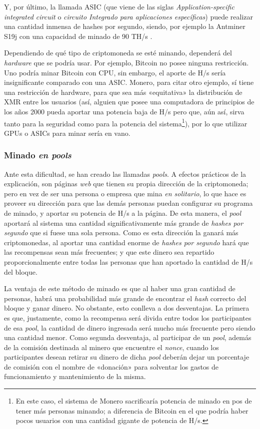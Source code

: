 \documentclass[12pt,a4paper,twoside]{book}
\begin{document}
Y, por último, la llamada ASIC (que viene de las siglas \textit{Application-specific integrated circuit} o \textit{circuito Integrado para aplicaciones específicas}) puede realizar una cantidad inmensa de hashes por segundo, siendo, por ejemplo la Antminer S19j con una capacidad de minado de 90 TH/s \cite{minado:gpuasic}.

Dependiendo de qué tipo de criptomoneda se esté minando, dependerá del \textit{hardware} que se podría usar. Por ejemplo, Bitcoin no posee ninguna restricción. Uno podría minar Bitcoin con CPU, sin embargo, el aporte de H/s sería insignificante comparado con una ASIC. Monero, para citar otro ejemplo, sí tiene una restricción de hardware, para que sea más «equitativa» la distribución de XMR entre los usuarios (así, alguien que posee una computadora de principios de los años 2000 pueda aportar una potencia baja de H/s pero que, aún así, sirva tanto para la seguridad como para la potencia del sistema\footnote{En este caso, el sistema de Monero sacrificaría potencia de minado en pos de tener más personas minando; a diferencia de Bitcoin en el que podría haber pocos usuarios con una cantidad gigante de potencia de H/s.}), por lo que utilizar GPUs o ASICs para minar sería en vano.

\subsubsection{Minado \textit{en pools}}
Ante esta dificultad, se han creado las llamadas \textit{pools}. A efectos prácticos de la explicación, son páginas \textit{web} que tienen su propia dirección de la criptomoneda; pero en vez de ser una persona o empresa que mina \textit{en solitario}, lo que hace es proveer su dirección para que las demás personas puedan configurar su programa de minado, y aportar su potencia de H/s a la página. De esta manera, el \textit{pool} aportará al sistema una cantidad significativamente más grande de \textit{hashes por segundo} que si fuese una sola persona. Como es esta dirección la ganará más criptomonedas, al aportar una cantidad enorme de \textit{hashes por segundo} hará que las recompensas sean más frecuentes; y que este dinero sea repartido proporcionalmente entre todas las personas que han aportado la cantidad de H/s del bloque.

La ventaja de este método de minado es que al haber una gran cantidad de personas, habrá una probabilidad más grande de encontrar el \textit{hash} correcto del bloque y ganar dinero. No obstante, esto conlleva a dos desventajas. La primera es que, justamente, como la recompensa será divida entre todos los participantes de esa \textit{pool}, la cantidad de dinero ingresada será mucho más frecuente pero siendo una cantidad menor. Como segunda desventaja, al participar de un \textit{pool}, además de la comisión destinada al minero que encuentre el \textit{nonce}, cuando los participantes desean retirar su dinero de dicha \textit{pool} deberán dejar un porcentaje de comisión con el nombre de «donación» para solventar los gastos de funcionamiento y mantenimiento de la misma.
\end{document}
